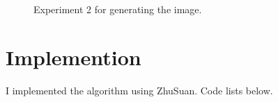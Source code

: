 \documentclass[a4paper]{article}
\begin{document}
\begin{landscape}
\begin{figure}

\caption{Experiment 2 for generating the image.}
\end{figure}
\end{landscape}


\section{Implemention}

 I implemented the algorithm using ZhuSuan. Code lists below.\\
\end{document}
